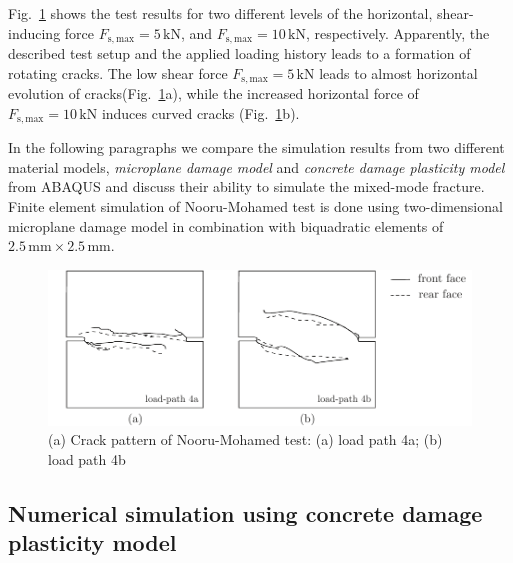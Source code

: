 \documentclass[main.tex]{subfiles}
\begin{document}
Fig.~\ref{FIGnoorumodamedcracks} shows the test results for two different levels of the horizontal, shear-inducing force $F_\mathrm{s,max} = 5\,\mathrm{kN}$, and $F_\mathrm{s,max} = 10\,\mathrm{kN}$, respectively. Apparently, the described test setup and the applied loading history leads to a formation of rotating cracks. The low shear force $F_\mathrm{s,max} = 5\,\mathrm{kN}$ leads to almost horizontal evolution of cracks(Fig.~\ref{FIGnoorumodamedcracks}a), while the increased horizontal force of $F_\mathrm{s,max}= 10\,\mathrm{kN}$ induces curved cracks (Fig.~\ref{FIGnoorumodamedcracks}b). 

In the following paragraphs we compare the simulation results from two different material models, \textit{microplane damage model} and \textit{concrete damage plasticity model} from ABAQUS and discuss their ability to simulate the mixed-mode fracture. Finite element simulation of Nooru-Mohamed test is done using two-dimensional microplane damage model in combination with biquadratic elements of $2.5\,\mathrm{mm} \times 2.5\,\mathrm{mm}$.
%
\begin{figure}
        \centering
        \includegraphics[scale=1]{fig/nooru-mohamed-cracks-test.pdf}
        \caption{(a) Crack pattern of Nooru-Mohamed test: (a) load path 4a; (b) load path 4b}
        \label{FIGnoorumodamedcracks}
\end{figure}

\subsection{Numerical simulation using concrete damage plasticity model}
\label{SEC:nooru-mohammed-CDP}
\end{document}

